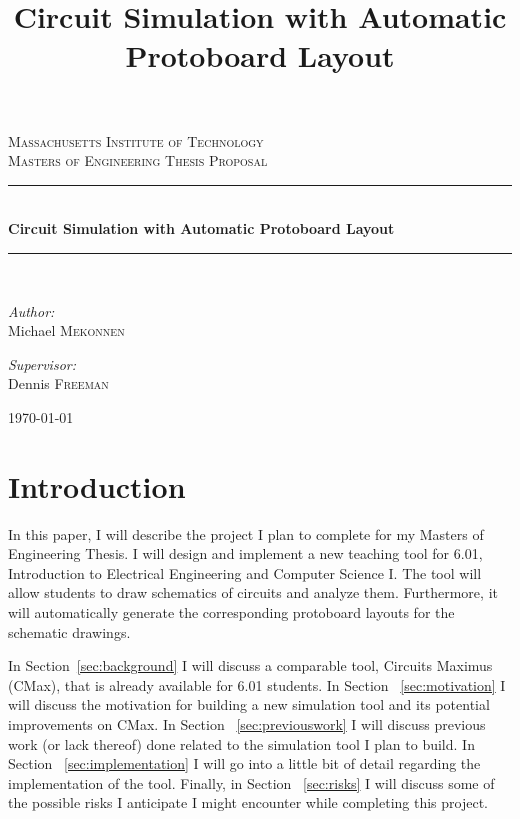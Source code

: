 \documentclass[12pt, doublespacing]{amsart}
\title{Circuit Simulation with Automatic Protoboard Layout}
\newcommand{\HRule}{\rule{\linewidth}{0.5mm}}
\begin{document}
\begin{titlepage}
\begin{center}

\textsc{\LARGE Massachusetts Institute of Technology}\\[1.5cm]

\textsc{\Large Masters of Engineering Thesis Proposal}\\[0.5cm]

\HRule \\[0.4cm]
{ \huge \bfseries Circuit Simulation with Automatic Protoboard Layout}\\[0.4cm]
\HRule \\[1.5cm]

\begin{minipage}{0.4\textwidth}
\begin{flushleft} \large
\emph{Author:} \\
Michael \textsc{Mekonnen}
\end{flushleft}
\end{minipage}
\begin{minipage}{0.4\textwidth}
\begin{flushright} \large
\emph{Supervisor:} \\
Dennis \textsc{Freeman}
\end{flushright}
\end{minipage}

\vfill

{\large \today}

\end{center}
\end{titlepage}

\maketitle

\section{Introduction}

In this paper, I will describe the project I plan to complete for my Masters of Engineering Thesis. I will design and implement a new teaching tool for 6.01, Introduction to Electrical Engineering and Computer Science I. The tool will allow students to draw schematics of circuits and analyze them. Furthermore, it will automatically generate the corresponding protoboard layouts for the schematic drawings.

In Section~\ref{sec:background} I will discuss a comparable tool, Circuits Maximus (CMax), that is already available for 6.01 students. In Section ~\ref{sec:motivation} I will discuss the motivation for building a new simulation tool and its potential improvements on CMax. In Section ~\ref{sec:previouswork} I will discuss previous work (or lack thereof) done related to the  simulation tool I plan to build. In Section ~\ref{sec:implementation} I will go into a little bit of detail regarding the implementation of the tool. Finally, in Section ~\ref{sec:risks} I will discuss some of the possible risks I anticipate I might encounter while completing this project.
\end{document}
